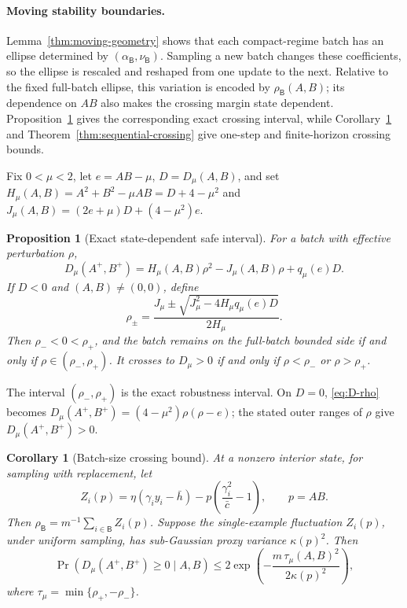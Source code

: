 \documentclass[11pt]{article}
\newtheorem{proposition}[theorem]{Proposition}
\newtheorem{corollary}[theorem]{Corollary}
\begin{document}
\paragraph{Moving stability boundaries.}
Lemma~\ref{thm:moving-geometry} shows that each compact-regime batch has an
ellipse determined by \((\alpha_{\mathsf B},\nu_{\mathsf B})\).  Sampling a
new batch changes these coefficients, so the ellipse is rescaled and
reshaped from one update to the next.  Relative to the fixed full-batch
ellipse, this variation is encoded by \(\rho_{\mathsf B}(A,B)\); its
dependence on \(AB\) also makes the crossing margin state dependent.
Proposition~\ref{thm:safe-interval} gives the corresponding exact crossing
interval, while Corollary~\ref{cor:batch-bound} and
Theorem~\ref{thm:sequential-crossing} give one-step and finite-horizon
crossing bounds.

Fix \(0<\mu<2\), let \(e=AB-\mu\), \(D=D_\mu(A,B)\), and set $H_\mu(A,B)=A^2+B^2-\mu AB=D+4-\mu^2$ and $J_\mu(A,B)=(2e+\mu)D+(4-\mu^2)e.$
\begin{proposition}[Exact state-dependent safe interval]
\label{thm:safe-interval}
For a batch with effective perturbation \(\rho\),
\begin{equation}
\label{eq:D-rho}
    D_\mu(A^+,B^+)
    =
    H_\mu(A,B)\rho^2
    -
    J_\mu(A,B)\rho
    +
    q_\mu(e)D.
\end{equation}
If \(D<0\) and \((A,B)\ne(0,0)\), define
\begin{equation}
\label{eq:rho-pm}
    \rho_\pm
    =
    \frac{J_\mu
    \pm\sqrt{J_\mu^2-4H_\mu q_\mu(e)D}}
    {2H_\mu}.
\end{equation}
Then \(\rho_-<0<\rho_+\), and the batch remains on the full-batch bounded
side if and only if \(\rho\in(\rho_-,\rho_+)\).  It crosses to
\(D_\mu>0\) if and only if \(\rho<\rho_-\) or \(\rho>\rho_+\).
\end{proposition}

The interval \((\rho_-,\rho_+)\) is the exact robustness interval.  On
\(D=0\), \eqref{eq:D-rho} becomes
\(D_\mu(A^+,B^+)=(4-\mu^2)\rho(\rho-e)\); the stated outer ranges of
\(\rho\) give \(D_\mu(A^+,B^+)>0\).

\begin{corollary}[Batch-size crossing bound]
\label{cor:batch-bound}
At a nonzero interior state, for sampling with replacement, let
\[
Z_i(p)
=
\eta(\gamma_i y_i-\bar h)
-
p\left(\frac{\gamma_i^2}{\bar c}-1\right),
\qquad p=AB.
\]
Then \(\rho_{\mathsf B}=m^{-1}\sum_{i\in\mathsf B}Z_i(p)\).  Suppose the
single-example fluctuation \(Z_i(p)\), under uniform sampling, has
sub-Gaussian proxy variance \(\kappa(p)^2\).  Then
\begin{equation}
\label{eq:crossing-bound}
\Pr(D_\mu(A^+,B^+)\ge0\mid A,B)
\le
2\exp\left(
-\frac{m\,\tau_\mu(A,B)^2}{2\kappa(p)^2}
\right),
\end{equation}
where \(\tau_\mu=\min\{\rho_+,-\rho_-\}\).
\end{corollary}
\end{document}
